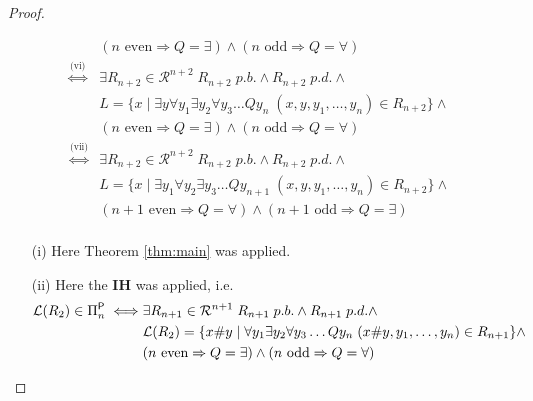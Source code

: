 \documentclass [11pt]{article}
\newcommand{\ccfont}[1]{\protect\mathsf{#1}}
\newcommand{\Ptime}{\ccfont{P}}
\newcommand{\php}[1]{\Pi_{#1}^{\Ptime}}
\newcommand{\sto}{\Rightarrow}
\begin{document}
\begin{proof}
\begin{itemize}
\begin{equation*}
\begin{split}
&  (n \text{ even}  \sto Q=\exists )\land (n \text{ odd}  \sto Q=\forall )\\
\stackrel{\text{(vi)}}{\iff} & \exists R_{n+2}  \in  \mathcal{R}^{n+2} \; R_{n+2} \; p.b. \land R_{n+2} \; p.d. \land  \\
& L = \{x \mid \exists y \forall y_1 \exists y_2\forall y_3\dots Q y_n  \; (x,y,y_1,\ldots,y_n) \in R_{n+2}\}\land  \\ 
&  (n \text{ even}  \sto Q=\exists )\land (n \text{ odd}  \sto Q=\forall )\\
\stackrel{\text{(vii)}}{\iff} & \exists R_{n+2}  \in  \mathcal{R}^{n+2} \; R_{n+2} \; p.b. \land R_{n+2} \; p.d. \land  \\
& L = \{x \mid \exists y_1 \forall y_2 \exists y_3 \dots Q y_{n+1}  \; (x,y,y_1,\ldots,y_n) \in R_{n+2}\}  \land \\ 
&  (n+1 \text{ even}  \sto Q=\forall) \land (n+1 \text{ odd}  \sto Q=\exists) \\
\end{split}
\end{equation*}
\end{itemize}

\begin{enumerate}
\item[(i)] Here Theorem \ref{thm:main} was applied.
\item[(ii)] Here the \textbf{IH} was applied, i.e. 
\begin{equation*}
\begin{split}
\mathcal{L}(R_2) \in \php{n} \iff& \exists R_{n+1}  \in  \mathcal{R}^{n+1} \; R_{n+1} \; p.b. \land R_{n+1} \; p.d. \land  \\
&\mathcal{L}(R_2) = \{x\#y \mid \forall y_1 \exists y_2\forall y_3\dots Q y_n  \; (x\#y,y_1,\ldots,y_n) \in R_{n+1}\} \land  \\
 & (n \text{ even}  \sto Q=\exists) \land (n \text{ odd}  \sto Q=\forall )
\end{split}
\end{equation*}



\end{enumerate}
\end{proof}
\end{document}
